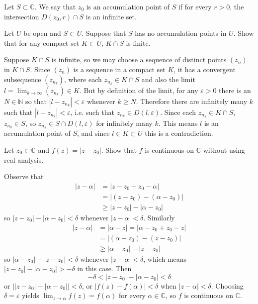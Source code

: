 \documentclass{article}
\newcounter{Problem}
\newenvironment{Problem}{\begin{Exercise}[name={Problem},
                                          counter={Problem}]}
                        {\end{Exercise}}
\begin{document}
\begin{Problem}
  Let $S \subset \mathbb{C}$. We say that $z_0$ is an accumulation
  point of $S$ if for every $r > 0$, the intersection
  $D(z_0, r) \cap S$ is an infinite set.

  Let $U$ be open and $S \subset U$. Suppose that $S$ has no accumulation
  points in $U$. Show that for any compact set $K \subset U$,
  $K \cap S$ is finite.
\end{Problem}

\begin{Answer}
  Suppose $K \cap S$ is infinite, so we may choose a sequence of distinct
  points $(z_n)$ in $K \cap S$. Since $(z_n)$ is a sequence in a compact set
  $K$, it has a convergent subsequence $(z_{n_k})$, where each
  $z_{n_k} \in K \cap S$ and also the limit
  $l = \lim_{k \to \infty} (z_{n_k}) \in K$.
  But by definition of the limit, for any $\varepsilon > 0$
  there is an $N \in \mathbb{N}$ so that
  $|l - z_{n_k}| < \varepsilon$ whenever $k \geq N$.
  Therefore there are infinitely many $k$ such that
  $|l - z_{n_k}| < \varepsilon$, i.e. such that
  $z_{n_k} \in D(l, \varepsilon)$. Since each $z_{n_k} \in K \cap S$,
  $z_{n_k} \in S$, so $z_{n_k} \in S \cap D(l, \varepsilon)$ for
  infinitely many $k$. This means $l$ is an accumulation point of $S$,
  and since $l \in K \subset U$ this is a contradiction.
\end{Answer}

\begin{Problem}
  Let $z_0 \in \mathbb{C}$ and $f(z) = |z - z_0|$. Show that
  $f$ is continuous on $\mathbb{C}$ without using real analysis.
\end{Problem}

\begin{Answer}
  Observe that
  \begin{align*}
          |z - \alpha|
    &=    |z - z_0 + z_0 - \alpha| \\
    &=    |(z - z_0) - (\alpha - z_0)| \\
    &\geq |z - z_0| - |\alpha - z_0|
  \end{align*}
  so $|z - z_0| - |\alpha - z_0| < \delta$ whenever $|z - \alpha| < \delta$.
  Similarly
  \begin{align*}
          |z - \alpha|
    &=    |\alpha - z|
     =    |\alpha - z_0 + z_0 - z| \\
    &=    |(\alpha - z_0) - (z - z_0)| \\
    &\geq |\alpha - z_0| - |z - z_0|
  \end{align*}
  so $|\alpha - z_0| - |z - z_0| < \delta$ whenever $|z - \alpha| < \delta$,
  which means $|z - z_0| - |\alpha - z_0| > -\delta$ in this case. Then
  $$
  -\delta < |z - z_0| - |\alpha - z_0| < \delta
  $$
  or $\left||z - z_0| - |\alpha - z_0|\right| < \delta$, or
  $|f(z) - f(\alpha)| < \delta$ when $|z - \alpha| < \delta$. Choosing
  $\delta = \varepsilon$ yields $\lim_{z \to \alpha} f(z) = f(\alpha)$ for
  every $\alpha \in \mathbb{C}$, so $f$ is continuous on $\mathbb{C}$.
\end{Answer}
\end{document}
